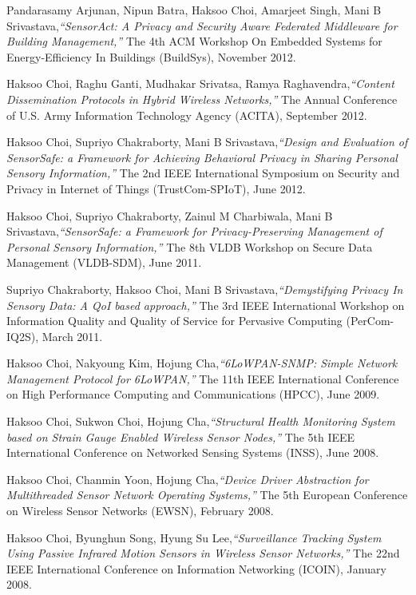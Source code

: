 \documentclass[12pt,letterpaper]{article}
\begin{document}
\bigskip
Pandarasamy Arjunan, Nipun Batra, Haksoo Choi, Amarjeet Singh, Mani B Srivastava,\emph{``SensorAct: A Privacy and Security Aware Federated Middleware for Building Management,''} The 4th ACM Workshop On Embedded Systems for Energy-Efficiency In Buildings (BuildSys), November 2012.

\bigskip
Haksoo Choi, Raghu Ganti, Mudhakar Srivatsa, Ramya Raghavendra,\emph{``Content Dissemination Protocols in Hybrid Wireless Networks,''} The Annual Conference of U.S. Army Information Technology Agency (ACITA), September 2012.

\bigskip
Haksoo Choi, Supriyo Chakraborty, Mani B Srivastava,\emph{``Design and Evaluation of SensorSafe: a Framework for Achieving Behavioral Privacy in Sharing Personal Sensory Information,''} The 2nd IEEE International Symposium on Security and Privacy in Internet of Things (TrustCom-SPIoT), June 2012.

\bigskip
Haksoo Choi, Supriyo Chakraborty, Zainul M Charbiwala, Mani B Srivastava,\emph{``SensorSafe: a Framework for Privacy-Preserving Management of Personal Sensory Information,''} The 8th VLDB Workshop on Secure Data Management (VLDB-SDM), June 2011.

\bigskip
Supriyo Chakraborty, Haksoo Choi, Mani B Srivastava,\emph{``Demystifying Privacy In Sensory Data: A QoI based approach,''} The 3rd IEEE International Workshop on Information Quality and Quality of Service for Pervasive Computing (PerCom-IQ2S), March 2011.

\bigskip
Haksoo Choi, Nakyoung Kim, Hojung Cha,\emph{``6LoWPAN-SNMP: Simple Network Management Protocol for 6LoWPAN,''} The 11th IEEE International Conference on High Performance Computing and Communications (HPCC), June 2009.

\bigskip
Haksoo Choi, Sukwon Choi, Hojung Cha,\emph{``Structural Health Monitoring System based on Strain Gauge Enabled Wireless Sensor Nodes,''} The 5th IEEE International Conference on Networked Sensing Systems (INSS), June 2008.

\bigskip
Haksoo Choi, Chanmin Yoon, Hojung Cha,\emph{``Device Driver Abstraction for Multithreaded Sensor Network Operating Systems,''} The 5th European Conference on Wireless Sensor Networks (EWSN), February 2008.

\bigskip
Haksoo Choi, Byunghun Song, Hyung Su Lee,\emph{``Surveillance Tracking System Using Passive Infrared Motion Sensors in Wireless Sensor Networks,''} The 22nd IEEE International Conference on Information Networking (ICOIN), January 2008.
\end{document}

